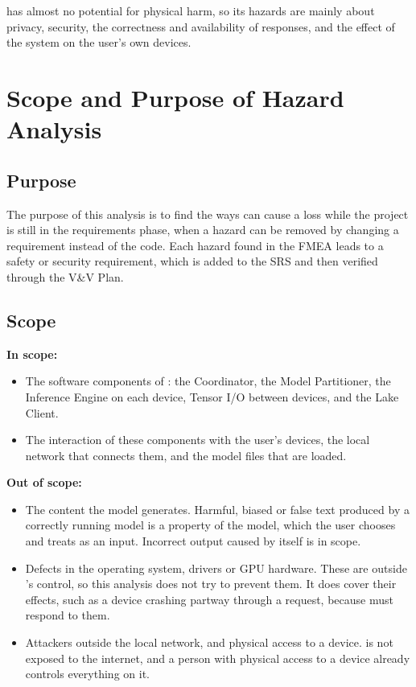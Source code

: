 \documentclass{article}
\begin{document}
\progname{} has almost no potential for physical harm, so its hazards are
mainly about privacy, security, the correctness and availability of
responses, and the effect of the system on the user's own devices.

\section{Scope and Purpose of Hazard Analysis}

\subsection{Purpose}

The purpose of this analysis is to find the ways \progname{} can cause a loss
while the project is still in the requirements phase, when a hazard can be
removed by changing a requirement instead of the code. Each hazard found in
the FMEA leads to a safety or security requirement, which is added to the SRS
and then verified through the V\&V Plan.

\subsection{Scope}

\noindent\textbf{In scope:}
\begin{itemize}
  \item The software components of \progname{}: the Coordinator, the Model
    Partitioner, the Inference Engine on each device, Tensor I/O between
    devices, and the Lake Client.
  \item The interaction of these components with the user's devices, the
    local network that connects them, and the model files that are loaded.
\end{itemize}

\noindent\textbf{Out of scope:}
\begin{itemize}
  \item The content the model generates. Harmful, biased or false
    text produced by a correctly running model is a property of the model,
    which the user chooses and \progname{} treats as an input. Incorrect
    output caused by \progname{} itself is in scope.
  \item Defects in the operating system, drivers or GPU hardware. These are
    outside \progname{}'s control, so this analysis does not try to prevent
    them. It does cover their effects, such as a device crashing partway
    through a request, because \progname{} must respond to them.
  \item Attackers outside the local network, and physical access to a
    device. \progname{} is not exposed to the internet, and a person with
    physical access to a device already controls everything on it.
\end{itemize}
\end{document}
